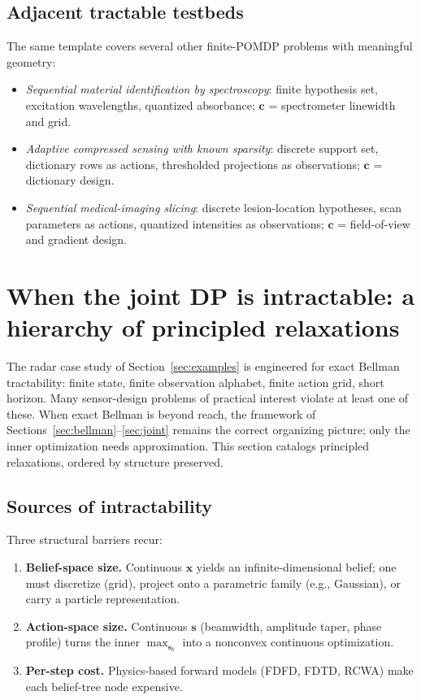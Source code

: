 \documentclass[11pt,a4paper]{article}
\begin{document}
\subsection{Adjacent tractable testbeds}

The same template covers several other finite-POMDP problems with meaningful geometry:
\begin{itemize}[nosep]
  \item \emph{Sequential material identification by spectroscopy}: finite hypothesis set, excitation wavelengths, quantized absorbance; $\bm{c}$ = spectrometer linewidth and grid.
  \item \emph{Adaptive compressed sensing with known sparsity}: discrete support set, dictionary rows as actions, thresholded projections as observations; $\bm{c}$ = dictionary design.
  \item \emph{Sequential medical-imaging slicing}: discrete lesion-location hypotheses, scan parameters as actions, quantized intensities as observations; $\bm{c}$ = field-of-view and gradient design.
\end{itemize}

\section{When the joint DP is intractable: a hierarchy of principled relaxations}
\label{sec:relaxations}

The radar case study of Section~\ref{sec:examples} is engineered for exact Bellman tractability: finite state, finite observation alphabet, finite action grid, short horizon.  Many sensor-design problems of practical interest violate at least one of these.  When exact Bellman is beyond reach, the framework of Sections~\ref{sec:bellman}--\ref{sec:joint} remains the correct organizing picture; only the inner optimization needs approximation.  This section catalogs principled relaxations, ordered by structure preserved.

\subsection{Sources of intractability}

Three structural barriers recur:
\begin{enumerate}[leftmargin=2em, nosep]
  \item \textbf{Belief-space size.}  Continuous $\bm{x}$ yields an infinite-dimensional belief; one must discretize (grid), project onto a parametric family (e.g., Gaussian), or carry a particle representation.
  \item \textbf{Action-space size.}  Continuous $\bm{s}$ (beamwidth, amplitude taper, phase profile) turns the inner $\max_{\bm{s}_k}$ into a nonconvex continuous optimization.
  \item \textbf{Per-step cost.}  Physics-based forward models (FDFD, FDTD, RCWA) make each belief-tree node expensive.
\end{enumerate}
\end{document}
